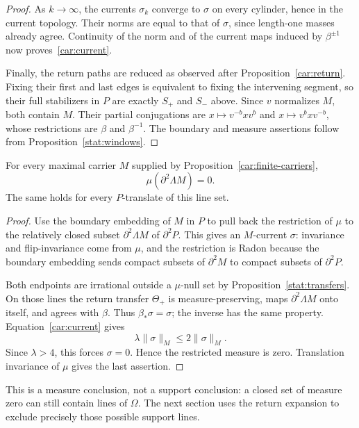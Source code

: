 \begin{proof}
As $k\to\infty$, the currents $\sigma_k$ converge to $\sigma$
on every cylinder, hence in the current topology.  Their norms
are equal to that of $\sigma$, since length-one masses already
agree.  Continuity of the norm and of the current maps induced
by $\beta^{\pm1}$ now proves~\eqref{car:current}.

Finally, the return paths are reduced as observed after
Proposition~\ref{car:return}.  Fixing their first and last edges
is equivalent to fixing the intervening segment, so their full
stabilizers in $P$ are exactly $S_+$ and $S_-$ above.  Since
$v$ normalizes $M$, both contain $M$.  Their partial conjugations
are $x\mapsto v^{-b}xv^b$ and $x\mapsto v^bxv^{-b}$, whose
restrictions are $\beta$ and $\beta^{-1}$.  The boundary and
measure assertions follow from Proposition~\ref{stat:windows}.
\end{proof}

\begin{proposition}
\label{car:zero-mass}
For every maximal carrier $M$ supplied by
Proposition~\ref{car:finite-carriers},
\[
 \mu(\partial^2\Lambda M)=0.
\]
The same holds for every $P$-translate of this line set.
\end{proposition}

\begin{proof}
Use the boundary embedding of $M$ in $P$ to pull back the
restriction of $\mu$ to the relatively closed subset
$\partial^2\Lambda M$ of $\partial^2P$.  This gives an
$M$-current $\sigma$: invariance and flip-invariance come from
$\mu$, and the restriction is Radon because the boundary
embedding sends compact subsets of $\partial^2M$ to compact
subsets of $\partial^2P$.

Both endpoints are irrational outside a $\mu$-null set by
Proposition~\ref{stat:transfers}.  On those lines the return transfer
$\Theta_+$ is measure-preserving, maps
$\partial^2\Lambda M$ onto itself, and agrees with $\beta$.
Thus $\beta_*\sigma=\sigma$; the inverse has the same property.
Equation~\eqref{car:current} gives
\[
 \lambda\|\sigma\|_M\le2\|\sigma\|_M.
\]
Since $\lambda>4$, this forces $\sigma=0$.  Hence the restricted
measure is zero.  Translation invariance of $\mu$ gives the
last assertion.
\end{proof}

This is a measure conclusion, not a support conclusion: a closed
set of measure zero can still contain lines of $\Omega$.  The
next section uses the return expansion to exclude precisely those
possible support lines.
